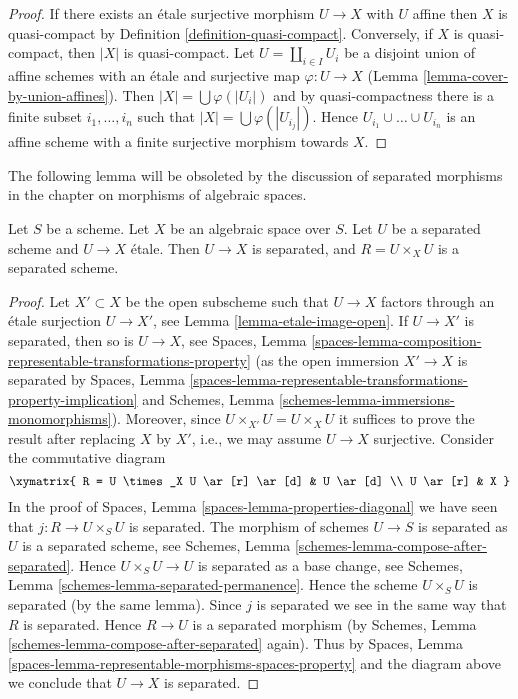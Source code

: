 \begin{proof}
If there exists an \'etale surjective morphism $U \to X$ with $U$
affine then $X$ is quasi-compact by Definition \ref{definition-quasi-compact}.
Conversely, if $X$ is quasi-compact, then $|X|$ is quasi-compact.
Let $U = \coprod_{i \in I} U_i$ be a disjoint union of affine schemes
with an \'etale and surjective map $\varphi : U \to X$
(Lemma \ref{lemma-cover-by-union-affines}).
Then $|X| = \bigcup \varphi(|U_i|)$ and
by quasi-compactness there is a finite subset $i_1, \ldots, i_n$
such that $|X| = \bigcup \varphi(|U_{i_j}|)$. Hence
$U_{i_1} \cup \ldots \cup U_{i_n}$ is an affine scheme with a
finite surjective morphism towards $X$.
\end{proof}

\noindent
The following lemma will be obsoleted by the discussion of
separated morphisms in the chapter on morphisms of algebraic spaces.

\begin{lemma}
\label{lemma-separated-cover}
Let $S$ be a scheme.
Let $X$ be an algebraic space over $S$.
Let $U$ be a separated scheme and $U \to X$ \'etale.
Then $U \to X$ is separated, and $R = U \times_X U$ is a separated scheme.
\end{lemma}

\begin{proof}
Let $X' \subset X$ be the open subscheme such that $U \to X$ factors
through an \'etale surjection $U \to X'$, see
Lemma \ref{lemma-etale-image-open}.
If $U \to X'$ is separated, then so is $U \to X$, see
Spaces, Lemma
\ref{spaces-lemma-composition-representable-transformations-property}
(as the open immersion $X' \to X$ is separated by
Spaces, Lemma
\ref{spaces-lemma-representable-transformations-property-implication}
and
Schemes, Lemma \ref{schemes-lemma-immersions-monomorphisms}).
Moreover, since $U \times_{X'} U = U \times_X U$ it suffices
to prove the result after replacing $X$ by $X'$, i.e., we may
assume $U \to X$ surjective.
Consider the commutative diagram
$$
\xymatrix{
R = U \times_X U \ar[r] \ar[d] & U \ar[d] \\
U \ar[r] & X
}
$$
In the proof of
Spaces, Lemma \ref{spaces-lemma-properties-diagonal}
we have seen that $j : R \to U \times_S U$ is separated.
The morphism of schemes $U \to S$ is separated as $U$ is a separated
scheme, see
Schemes, Lemma \ref{schemes-lemma-compose-after-separated}.
Hence $U \times_S U \to U$ is separated as a base change, see
Schemes, Lemma \ref{schemes-lemma-separated-permanence}.
Hence the scheme $U \times_S U$ is separated (by the same lemma).
Since $j$ is separated we see in the same way that $R$ is separated.
Hence $R \to U$ is a separated morphism (by
Schemes, Lemma \ref{schemes-lemma-compose-after-separated}
again). Thus by
Spaces, Lemma \ref{spaces-lemma-representable-morphisms-spaces-property}
and the diagram above we conclude that $U \to X$ is separated.
\end{proof}

